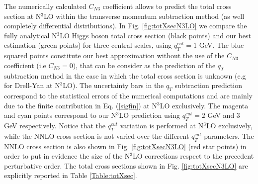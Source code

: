 \documentclass[12pt]{article}
\def\qt{q_T}
\begin{document}
The numerically calculated $C_{N3}$ coefficient allows to predict the total cross section at N$^{3}$LO within the transverse momentum subtraction method (as well completely differential distributions). In Fig. \ref{fig:totXsecN3LO} we compare the fully analytical N$^{3}$LO Higgs boson total cross section \cite{Mistlberger:2018etf} (black points) and our best estimation (green points) for three central scales, using $q^{cut}_{T}=1$ GeV. The blue squared points constitute our best approximation without the use of the $C_{N3}$ coefficient (i.e $C_{N3}=0$), that can be consider as the prediction of the $\qt$ subtraction method in the case in which the total cross section is unknown (e.g for Drell-Yan at N$^{3}$LO). The uncertainty bars in the $\qt$ subtraction prediction correspond to the statistical errors of the numerical computations and are mainly due to the finite contribution in Eq. (\ref{sigfin}) at N$^{3}$LO exclusively. The magenta and cyan points correspond to our N$^{3}$LO prediction using $q^{cut}_{T}=2$ GeV and 3 GeV respectively. Notice that the $q^{cut}_{T}$ variation is performed at N$^{3}$LO exclusively, while the NNLO cross section is not varied over the different $q^{cut}_{T}$ parameters.
The NNLO cross section is also shown in Fig. \ref{fig:totXsecN3LO} (red star points) in order to put in evidence the size of the N$^{3}$LO corrections respect to the precedent perturbative order. The total cross sections shown in Fig. \ref{fig:totXsecN3LO} are explicitly reported in Table \ref{Table:totXsec}.
\end{document}

